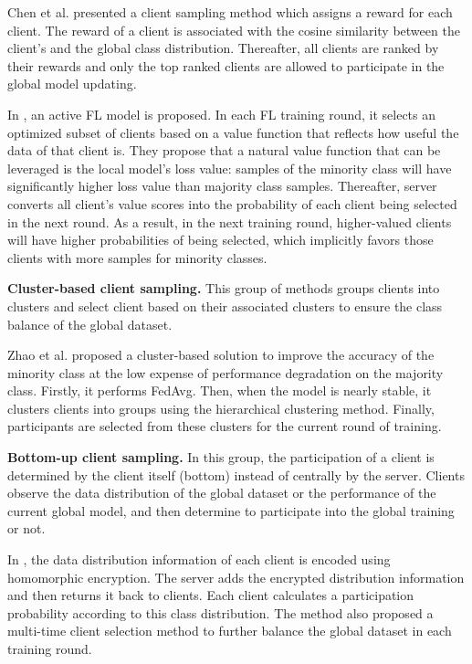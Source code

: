 \documentclass[10pt,journal,compsoc]{IEEEtran}
\begin{document}
Chen et al. \cite{chen2021novel} presented a client sampling method which assigns a reward for each client. The reward of a client is associated with the cosine similarity between the client's and the global  class distribution. Thereafter, all clients are ranked by their rewards and only the top ranked clients are allowed to participate in the global model updating.  

In \cite{goetz2019active}, an active FL model is proposed. In each FL training round, it selects an optimized subset of clients based on a value function that reflects how useful the data of that client is. They propose that a natural value function that can be leveraged is the local model's loss value: samples of the minority class will have significantly higher loss value than majority class samples. Thereafter, server converts all client's value scores into the probability of each client being selected in the next round. As a result, in the next training round, higher-valued clients will have higher probabilities of being selected, which implicitly favors those clients with more samples for minority classes.

\textbf{Cluster-based client sampling.} This group of methods groups clients into clusters and select client based on their associated clusters to ensure the class balance of the global dataset.

Zhao et al. \cite{zhao2020cluster} proposed a cluster-based solution to improve the accuracy of the minority class at the low expense of performance degradation on the majority class. Firstly, it performs FedAvg. Then, when the model is nearly stable, it clusters clients into groups using the hierarchical clustering method. Finally, participants are selected from these clusters for the current round of training.

\textbf{Bottom-up client sampling.} In this group, the participation of a client is determined by the client itself (bottom) instead of centrally by the server. Clients observe the data distribution of the global dataset or the performance of the current global model, and then determine to participate into the global training or not. 

In \cite{zhang2021dubhe}, the data distribution information of each client is encoded using homomorphic encryption. The server adds the encrypted distribution information and then returns it back to clients. Each client calculates a participation probability according to this class distribution. The method also proposed a multi-time client selection method to further balance the global dataset in each training round. 
\end{document}
